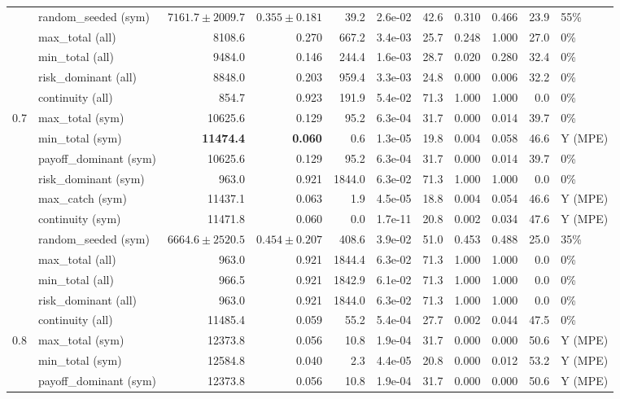 \begin{tabular}{rlrrrrrrrrl}
 & random\_seeded (sym) & $7161.7 \pm 2009.7$ & $0.355 \pm 0.181$ & 39.2 & 2.6e-02 & 42.6 & 0.310 & 0.466 & 23.9 & 55\% \\
 & max\_total (all) & 8108.6 & 0.270 & 667.2 & 3.4e-03 & 25.7 & 0.248 & 1.000 & 27.0 & 0\% \\
 & min\_total (all) & 9484.0 & 0.146 & 244.4 & 1.6e-03 & 28.7 & 0.020 & 0.280 & 32.4 & 0\% \\
 & risk\_dominant (all) & 8848.0 & 0.203 & 959.4 & 3.3e-03 & 24.8 & 0.000 & 0.006 & 32.2 & 0\% \\
 & continuity (all) & 854.7 & 0.923 & 191.9 & 5.4e-02 & 71.3 & 1.000 & 1.000 & 0.0 & 0\% \\
\midrule
0.7 & max\_total (sym) & 10625.6 & 0.129 & 95.2 & 6.3e-04 & 31.7 & 0.000 & 0.014 & 39.7 & 0\% \\
 & min\_total (sym) & \textbf{11474.4} & \textbf{0.060} & 0.6 & 1.3e-05 & 19.8 & 0.004 & 0.058 & 46.6 & Y (MPE) \\
 & payoff\_dominant (sym) & 10625.6 & 0.129 & 95.2 & 6.3e-04 & 31.7 & 0.000 & 0.014 & 39.7 & 0\% \\
 & risk\_dominant (sym) & 963.0 & 0.921 & 1844.0 & 6.3e-02 & 71.3 & 1.000 & 1.000 & 0.0 & 0\% \\
 & max\_catch (sym) & 11437.1 & 0.063 & 1.9 & 4.5e-05 & 18.8 & 0.004 & 0.054 & 46.6 & Y (MPE) \\
 & continuity (sym) & 11471.8 & 0.060 & 0.0 & 1.7e-11 & 20.8 & 0.002 & 0.034 & 47.6 & Y (MPE) \\
 & random\_seeded (sym) & $6664.6 \pm 2520.5$ & $0.454 \pm 0.207$ & 408.6 & 3.9e-02 & 51.0 & 0.453 & 0.488 & 25.0 & 35\% \\
 & max\_total (all) & 963.0 & 0.921 & 1844.4 & 6.3e-02 & 71.3 & 1.000 & 1.000 & 0.0 & 0\% \\
 & min\_total (all) & 966.5 & 0.921 & 1842.9 & 6.1e-02 & 71.3 & 1.000 & 1.000 & 0.0 & 0\% \\
 & risk\_dominant (all) & 963.0 & 0.921 & 1844.0 & 6.3e-02 & 71.3 & 1.000 & 1.000 & 0.0 & 0\% \\
 & continuity (all) & 11485.4 & 0.059 & 55.2 & 5.4e-04 & 27.7 & 0.002 & 0.044 & 47.5 & 0\% \\
\midrule
0.8 & max\_total (sym) & 12373.8 & 0.056 & 10.8 & 1.9e-04 & 31.7 & 0.000 & 0.000 & 50.6 & Y (MPE) \\
 & min\_total (sym) & 12584.8 & 0.040 & 2.3 & 4.4e-05 & 20.8 & 0.000 & 0.012 & 53.2 & Y (MPE) \\
 & payoff\_dominant (sym) & 12373.8 & 0.056 & 10.8 & 1.9e-04 & 31.7 & 0.000 & 0.000 & 50.6 & Y (MPE) \\

\end{tabular}
